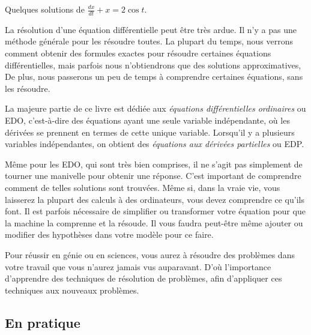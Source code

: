 \begin{mywrapfig}{3.25in}
\capstart
{}
\caption{Quelques solutions de $\frac{dx}{dt} + x = 2 \cos t$.\label{intro:plotsfig}}
\end{mywrapfig}%

La résolution d'une \'equation diff\'erentielle peut \^etre tr\`es ardue.  Il n'y a pas une m\'ethode g\'en\'erale pour les r\'esoudre toutes. La plupart du temps, nous verrons comment obtenir des formules exactes pour r\'esoudre certaines \'equations diff\'erentielles, mais parfois nous n'obtiendrons que des solutions approximatives,  De plus, nous passerons un peu de temps \`a comprendre certaines \'equations, sans les r\'esoudre.

La majeure partie de ce livre est d\'edi\'ee aux 
\emph{\'equations diff\'erentielles ordinaires}
ou EDO, c'est-\`a-dire des \'equations ayant une seule variable ind\'ependante, o\`u les d\'eriv\'ees se prennent en termes de cette unique variable.  Lorsqu'il y a plusieurs variables ind\'ependantes, on obtient des 
\emph{\'equations aux d\'eriv\'ees partielles }
ou EDP.

M\^eme pour les EDO, qui sont tr\`es bien comprises, il ne s'agit pas simplement de tourner une manivelle pour obtenir une r\'eponse.  
  C'est important de comprendre comment de telles solutions sont trouv\'ees.  M\^eme si, dans la vraie vie, vous laisserez la plupart des calculs \`a des ordinateurs, vous devez comprendre ce qu'ils font.  Il est parfois n\'ecessaire de simplifier ou transformer votre \'equation pour que la machine la comprenne et la r\'esoude.  Il vous faudra peut-\^etre m\^eme ajouter ou modifier des hypoth\`eses dans votre mod\`ele pour ce faire.
  
Pour r\'eussir en g\'enie ou en sciences, vous aurez \`a r\'esoudre des probl\`emes dans votre travail que vous n'aurez jamais vus auparavant.  D'o\`u l'importance d'apprendre des techniques de r\'esolution de probl\`emes, afin d'appliquer ces techniques aux nouveaux probl\`emes.  
 
\subsection{En pratique}
\begin{myfig}
\end{myfig}

